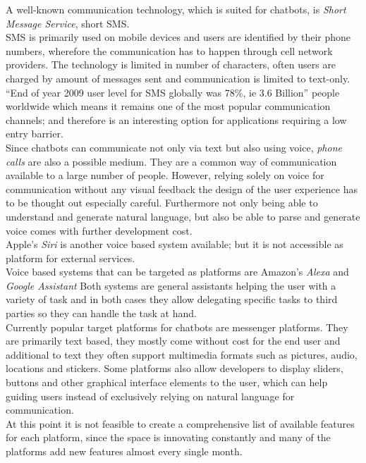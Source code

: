 A well-known communication technology, which is suited for chatbots, is \emph{Short Message Service}, short SMS.
\\
SMS is primarily used on mobile devices and users are identified by their phone numbers, wherefore the communication has to happen through cell network providers. The technology is limited in number of characters, often users are charged by amount of messages sent and communication is limited to text-only. ``End of year 2009 user level for SMS globally was 78\%, ie 3.6 Billion''\cite{mobilenumbers} people worldwide which means it remains one of the most popular communication channels; and therefore is an interesting option for applications requiring a low entry barrier.
\\

Since chatbots can communicate not only via text but also using voice, \emph{phone calls} are also a possible medium. They are a common way of communication available to a large number of people. However, relying solely on voice for communication without any visual feedback the design of the user experience has to be thought out especially careful. Furthermore not only being able to understand and generate natural language, but also be able to parse and generate voice comes with further development cost.
\\

Apple's \emph{Siri} is another voice based system available; but it is not accessible as platform for external services.
\\
Voice based systems that can be targeted as platforms are Amazon's \emph{Alexa} and \emph{Google Assistant} Both systems are general assistants helping the user with a variety of task and in both cases they allow delegating specific tasks to third parties so they can handle the task at hand.
\\

Currently popular target platforms for chatbots are messenger platforms. They are primarily text based, they mostly come without cost for the end user and additional to text they often support multimedia formats such as pictures, audio, locations and stickers. Some platforms also allow developers to display sliders, buttons and other graphical interface elements to the user, which can help guiding users instead of exclusively relying on natural language for communication.
\\
At this point it is not feasible to create a comprehensive list of available features for each platform, since the space is innovating constantly and many of the platforms add new features almost every single month.
\\

